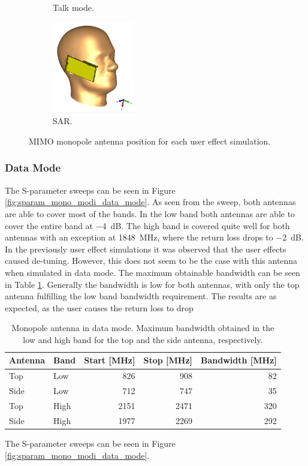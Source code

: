 \begin{figure}[htbp]
\begin{subfigure}[b]{0.24\linewidth}
        \caption{Talk mode.}
    \end{subfigure}
    \begin{subfigure}[b]{0.24\linewidth}
        \centering \includegraphics[width=\linewidth,height=4cm,keepaspectratio]{img/tech_sol/monopole/highband/ue/sar/3d_sar.PNG}
        \caption{SAR.}
    \end{subfigure}
    \caption{MIMO monopole antenna position for each user effect simulation.}
    \label{fig:position_mono_modi}
\end{figure}

\FloatBarrier
\subsubsection{Data Mode}
The S-parameter sweeps can be seen in Figure \ref{fig:sparam_mono_modi_data_mode}. As seen from the sweep, both antennas are able to cover most of the bands. In the low band both antennas are able to cover the entire band at \SI{-4}{dB}. The high band is covered quite well for both antennas with an exception at \SI{1848}{MHz}, where the return loss drops to \SI{-2}{dB}. In the previously user effect simulations   
it was observed that the user effects caused de-tuning. However, this does not seem to be the case with this antenna when simulated in data mode. The maximum obtainable bandwidth can be seen in Table \ref{tab:bw_mono_modi_dm}. Generally the bandwidth is low for both antennas, with only the top antenna fulfilling the low band bandwidth requirement. The results are as expected, as the user causes the return loss to drop 


\begin{table}[htbp]
  \centering
  \begin{tabular}{|l|l|r|r|r|}
    \hline
    Antenna & Band & Start [MHz] & Stop [MHz] & Bandwidth [MHz] \\
    \hline
    Top     & Low  &  826  & 908  & 82 \\
    Side    & Low  &  712  & 747  & 35  \\
    \hline
    Top     & High &  2151 &  2471  & 320 \\
    Side    & High & 1977 &  2269 & 292 \\
    \hline
  \end{tabular}
  \caption{Monopole antenna in data mode. Maximum bandwidth obtained in the low and high band for the top and the side antenna, respectively.}    
  \label{tab:bw_mono_modi_dm}
\end{table}
The S-parameter sweeps can be seen in Figure \ref{fig:sparam_mono_modi_data_mode}.

